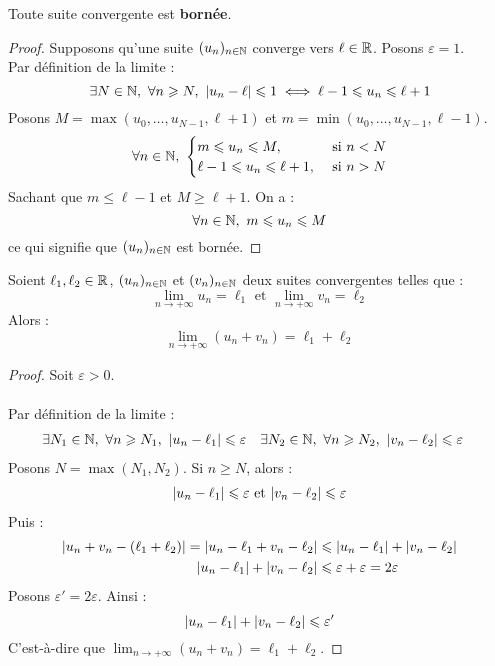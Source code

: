 \begin{theorem}
    Toute suite convergente est \textbf{bornée}.
\end{theorem}

\begin{proof}
    Supposons qu'une suite $(u_n)_{n \in \mathbb{N}}$ converge vers $\ell \in \mathbb{R}$.
    Posons $\varepsilon = 1$. 
    \\
    Par définition de la limite :
    \[ \exists N \in \mathbb{N},\ \forall n \geqslant N,\ \abs{u_n - \ell} \leqslant 1 \iff \ell - 1 \leqslant u_n \leqslant \ell + 1 \]
    Posons $M = \max(u_0, \ldots, u_{N-1}, \ell + 1)$ et $m = \min(u_0, \ldots, u_{N - 1}, \ell - 1)$.
    \begin{align*}
        \forall n \in \N,\ 
        \begin{cases}
            m \leq u_n \leq M, &\text{ si } n < N \\
            \ell - 1 \leq u_n \leq \ell + 1, &\text{ si } n > N
        \end{cases}
    \end{align*}
    Sachant que $m \leq \ell - 1$ et $M \geq \ell + 1$.
    On a :
    \[ \forall n \in \mathbb{N},\ m \leqslant u_n \leqslant M \]
    ce qui signifie que $(u_n)_{n \in \mathbb{N}}$ est bornée.
\end{proof}

\begin{theorem}
    Soient $\ell_1, \ell_2 \in \mathbb{R}$, $(u_n)_{n \in \mathbb{N}}$ et $(v_n)_{n \in \mathbb{N}}$ deux suites convergentes telles que :
    \[ \lim_{n \to +\infty} u_n = \ell_1 \text{ et } \lim_{n \to +\infty} v_n = \ell_2 \]
    Alors :
    \[ \lim_{n \to +\infty} (u_n + v_n) = \ell_1 + \ell_2 \]
\end{theorem}

\begin{proof}
    Soit $\varepsilon > 0$.
    \\
    \\
    Par définition de la limite :
    \begin{align*}
        &\exists N_1 \in \mathbb{N},\ \forall n \geqslant N_1,\ \abs{u_n - \ell_1} \leqslant \varepsilon &
        &\exists N_2 \in \mathbb{N},\ \forall n \geqslant N_2,\ \abs{v_n - \ell_2} \leqslant \varepsilon
    \end{align*}
    Posons $N = \max(N_1, N_2)$. Si $n \geq N$, alors :
    \begin{align*}
        \abs{u_n - \ell_1} \leqslant \varepsilon \text{ et } \abs{v_n - \ell_2} \leqslant \varepsilon
    \end{align*}
    Puis : 
    \begin{align*}
        \abs{u_n + v_n - (\ell_1 + \ell_2)} = \abs{u_n - \ell_1 + v_n - \ell_2} &\leqslant \abs{u_n - \ell_1} + \abs{v_n - \ell_2} \\
        \abs{u_n - \ell_1} + \abs{v_n - \ell_2} &\leqslant \varepsilon + \varepsilon = 2 \varepsilon
    \end{align*}
    Posons $\varepsilon' = 2\varepsilon$.
    Ainsi : 
    \[ \abs{u_n - \ell_1} + \abs{v_n - \ell_2} \leqslant \varepsilon' \]
    C'est-à-dire que $\lim_{n \to +\infty} (u_n + v_n) = \ell_1 + \ell_2$.
\end{proof}

